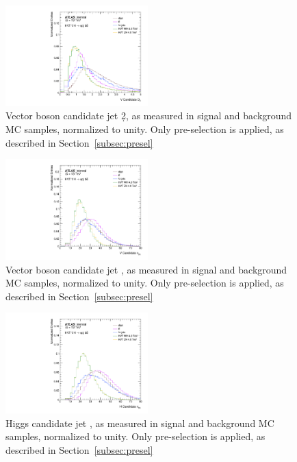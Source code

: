 \begin{figure}[htbp!]
\begin{center}
    \includegraphics[width=0.49\textwidth]{VHqqbb_SimpleSigBkgMC_d2V.pdf}
\end{center}
\caption{Vector boson candidate jet \d2, as measured in signal and background MC samples, normalized to unity. Only pre-selection is applied, as described in Section~\ref{subsec:presel} }
\label{fig:simple_mc_d2V}
\end{figure}

\begin{figure}[htbp!]
\begin{center}
    \includegraphics[width=0.49\textwidth]{VHqqbb_SimpleSigBkgMC_ntrkVVJJ_V.pdf}
\end{center}
\caption{Vector boson candidate jet \ntrk, as measured in signal and background MC samples, normalized to unity. Only pre-selection is applied, as described in Section~\ref{subsec:presel} }
\label{fig:simple_mc_ntrkV}
\end{figure}

\begin{figure}[htbp!]
\begin{center}
    \includegraphics[width=0.49\textwidth]{VHqqbb_SimpleSigBkgMC_ntrkVVJJ_H.pdf}
\end{center}
\caption{Higgs candidate jet \ntrk, as measured in signal and background MC samples, normalized to unity. Only pre-selection is applied, as described in Section~\ref{subsec:presel} }
\label{fig:simple_mc_ntrkH}
\end{figure}

